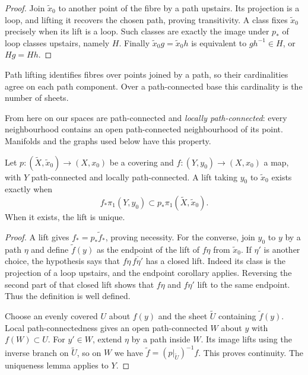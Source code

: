 \begin{proof}
Join $\tilde x_0$ to another point of the fibre by a path upstairs. Its projection is a loop, and lifting it recovers the chosen path, proving transitivity. A class fixes $\tilde x_0$ precisely when its lift is a loop. Such classes are exactly the image under $p_*$ of loop classes upstairs, namely $H$. Finally $\tilde x_0g=\tilde x_0h$ is equivalent to $gh^{-1}\in H$, or $Hg=Hh$.
\end{proof}

Path lifting identifies fibres over points joined by a path, so their cardinalities agree on each path component. Over a path-connected base this cardinality is the number of sheets.

From here on our spaces are path-connected and \emph{locally path-connected}: every neighbourhood contains an open path-connected neighbourhood of its point. Manifolds and the graphs used below have this property.

\begin{theorem}\label{thm:liftcrit}
Let $p:(\tilde X,\tilde x_0)\to(X,x_0)$ be a covering and $f:(Y,y_0)\to(X,x_0)$ a map, with $Y$ path-connected and locally path-connected. A lift taking $y_0$ to $\tilde x_0$ exists exactly when
\[
f_*\pi_1(Y,y_0)\subset p_*\pi_1(\tilde X,\tilde x_0).
\]
When it exists, the lift is unique.
\end{theorem}

\begin{proof}
A lift gives $f_*=p_*\tilde f_*$, proving necessity. For the converse, join $y_0$ to $y$ by a path $\eta$ and define $\tilde f(y)$ as the endpoint of the lift of $f\eta$ from $\tilde x_0$. If $\eta'$ is another choice, the hypothesis says that $f\eta\,\overline{f\eta'}$ has a closed lift. Indeed its class is the projection of a loop upstairs, and the endpoint corollary applies. Reversing the second part of that closed lift shows that $f\eta$ and $f\eta'$ lift to the same endpoint. Thus the definition is well defined.

Choose an evenly covered $U$ about $f(y)$ and the sheet $\tilde U$ containing $\tilde f(y)$. Local path-connectedness gives an open path-connected $W$ about $y$ with $f(W)\subset U$. For $y'\in W$, extend $\eta$ by a path inside $W$. Its image lifts using the inverse branch on $\tilde U$, so on $W$ we have $\tilde f=(p|_{\tilde U})^{-1}f$. This proves continuity. The uniqueness lemma applies to $Y$.
\end{proof}


